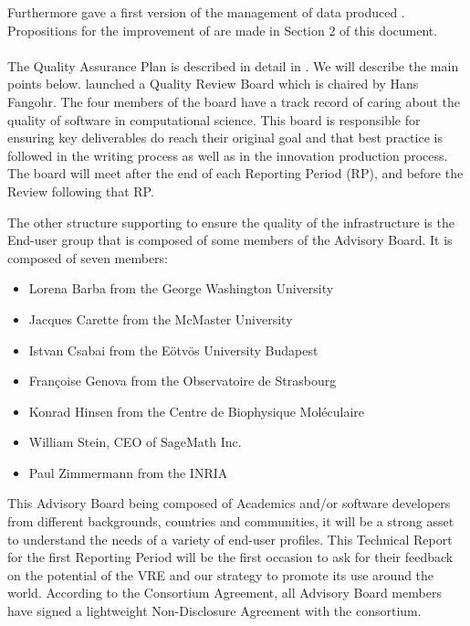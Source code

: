 \documentclass{deliverablereport}
\begin{document}
Furthermore  gave a first version of the management of data produced \ODK. Propositions for the improvement of are made in Section 2 of this document. 


\paragraph{}


The Quality Assurance Plan is described in detail in . We will describe the main points below.
 launched a Quality Review Board which is chaired by Hans Fangohr. The four members of the board have a track record of caring about the quality of software in computational science. This board is responsible for ensuring key deliverables do reach their original goal and that best practice is followed in the writing process as well as in the innovation production process.
The board will meet after the end of each Reporting Period (RP), and before the Review following that RP.

The other structure supporting \ODK to ensure the quality of the
infrastructure is the End-user group that is composed of some members
of the Advisory Board. It is composed of seven members:

\begin{itemize}
\item{Lorena Barba from the George Washington University}
\item{Jacques Carette from the McMaster University}
\item{Istvan Csabai from the Eötvös University Budapest}
\item{Françoise Genova from the Observatoire de Strasbourg}
\item{Konrad Hinsen from the Centre de Biophysique Moléculaire}
\item{William Stein, CEO of SageMath Inc.}
\item{Paul Zimmermann from the INRIA}
\end{itemize}

This Advisory Board being composed of Academics and/or software
developers from different backgrounds, countries and communities, it
will be a strong asset to understand the needs of a variety of
end-user profiles. This Technical Report for the first Reporting
Period will be the first occasion to ask for their feedback on the
potential of the VRE and our strategy to promote its use around the
world. According to the Consortium Agreement, all Advisory Board
members have signed a lightweight Non-Disclosure Agreement with the
consortium.
\end{document}

